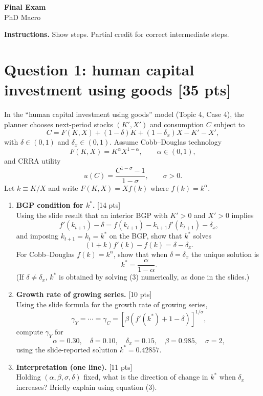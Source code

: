 \documentclass[12pt]{article}
\newcommand{\pts}[1]{\hfill{\small[#1 pts]}}
\begin{document}
\begin{center}
{\Large \textbf{Final Exam}}\\
PhD Macro\\
\medskip
\end{center}
\textbf{Instructions.} Show steps. Partial credit for correct intermediate steps.

\section*{Question 1: human capital investment using goods \pts{35}}

In the ``human capital investment using goods'' model (Topic 4, Case 4), the planner chooses next-period stocks
\((K',X')\) and consumption \(C\) subject to
\[
C = F(K,X) + (1-\delta)K + (1-\delta_x)X - K' - X',
\]
with \(\delta\in(0,1)\) and \(\delta_x\in(0,1)\).
Assume Cobb--Douglas technology
\[
F(K,X)=K^{\alpha}X^{1-\alpha}, \qquad \alpha\in(0,1),
\]
and CRRA utility
\[
u(C)=\frac{C^{1-\sigma}-1}{1-\sigma},\qquad \sigma>0.
\]
Let \(k\equiv K/X\) and write \(F(K,X)=X f(k)\) where \(f(k)=k^{\alpha}\).

\begin{enumerate}[label=(\alph*)]
\item \textbf{BGP condition for \(k^\ast\).} \pts{14}\\
Using the slide result that an interior BGP with \(K'>0\) and \(X'>0\) implies
\[
f'(k_{t+1})-\delta = f(k_{t+1})-k_{t+1}f'(k_{t+1})-\delta_x,
\]
and imposing \(k_{t+1}=k_t=k^\ast\) on the BGP, show that \(k^\ast\) solves
\[
(1+k)f'(k)-f(k)=\delta-\delta_x.
\tag{3}
\]
For Cobb--Douglas \(f(k)=k^\alpha\), show that when \(\delta=\delta_x\) the unique solution is
\[
k^\ast=\frac{\alpha}{1-\alpha}.
\]
(If \(\delta\neq \delta_x\), \(k^\ast\) is obtained by solving (3) numerically, as done in the slides.)

\item \textbf{Growth rate of growing series.} \pts{10}\\
Using the slide formula for the growth rate of growing series,
\[
\gamma_Y = \cdots = \gamma_C =
\left[\beta\left(f'(k^\ast)+1-\delta\right)\right]^{1/\sigma},
\]
compute \(\gamma_Y\) for
\[
\alpha=0.30,\quad \delta=0.10,\quad \delta_x=0.15,\quad \beta=0.985,\quad \sigma=2,
\]
using the slide-reported solution \(k^\ast=0.42857\).

\item \textbf{Interpretation (one line).} \pts{11}\\
Holding \((\alpha,\beta,\sigma,\delta)\) fixed, what is the direction of change in \(k^\ast\) when \(\delta_x\) increases?
Briefly explain using equation (3).
\end{enumerate}
\end{document}
